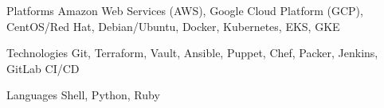 \begin{cvskills}

\cvskill
    {Platforms}
    {Amazon Web Services (AWS), Google Cloud Platform (GCP), CentOS/Red Hat, Debian/Ubuntu, Docker, Kubernetes, EKS, GKE}

\cvskill
    {Technologies}
    {Git, Terraform, Vault, Ansible, Puppet, Chef, Packer, Jenkins, GitLab CI/CD}

\cvskill
    {Languages}
    {Shell, Python, Ruby}

\end{cvskills}